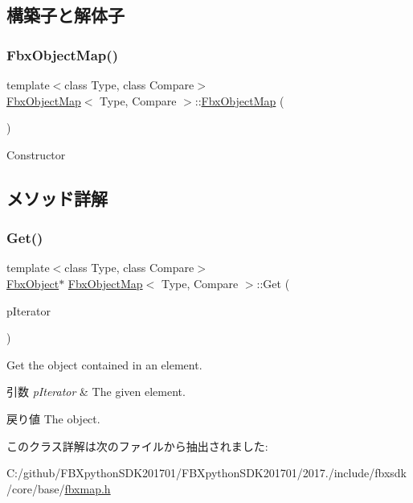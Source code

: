 \subsection{構築子と解体子}
\mbox{\label{class_fbx_object_map_a6567cb563c8c14bf79104468c8622d44}} 
\subsubsection{\texorpdfstring{Fbx\+Object\+Map()}{FbxObjectMap()}}
{\footnotesize\ttfamily template$<$class Type, class Compare$>$ \\
\hyperlink{class_fbx_object_map}{Fbx\+Object\+Map}$<$ Type, Compare $>$\+::\hyperlink{class_fbx_object_map}{Fbx\+Object\+Map} (\begin{DoxyParamCaption}{ }\end{DoxyParamCaption})}



Constructor 



\subsection{メソッド詳解}
\mbox{\label{class_fbx_object_map_a0f91929931a5379c7983812644ff706a}} 
\subsubsection{\texorpdfstring{Get()}{Get()}}
{\footnotesize\ttfamily template$<$class Type, class Compare$>$ \\
\hyperlink{class_fbx_object}{Fbx\+Object}$\ast$ \hyperlink{class_fbx_object_map}{Fbx\+Object\+Map}$<$ Type, Compare $>$\+::Get (\begin{DoxyParamCaption}\item[{typename \hyperlink{class_fbx_simple_map}{Fbx\+Simple\+Map}$<$ Type, \hyperlink{class_fbx_object}{Fbx\+Object} $\ast$, Compare $>$\+::\hyperlink{class_fbx_simple_map_aaa589eb5e1ccdd11dffd018f3212e13e}{Iterator}}]{p\+Iterator }\end{DoxyParamCaption})}

Get the object contained in an element. 
\begin{DoxyParams}{引数}
{\em p\+Iterator} & The given element. \\
\hline
\end{DoxyParams}
\begin{DoxyReturn}{戻り値}
The object. 
\end{DoxyReturn}


このクラス詳解は次のファイルから抽出されました\+:\begin{DoxyCompactItemize}
\item 
C\+:/github/\+F\+B\+Xpython\+S\+D\+K201701/\+F\+B\+Xpython\+S\+D\+K201701/2017./include/fbxsdk/core/base/\hyperlink{fbxmap_8h}{fbxmap.\+h}\end{DoxyCompactItemize}
